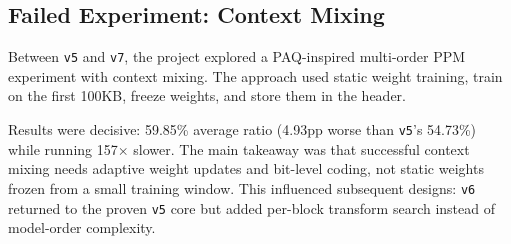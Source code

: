 \subsection{Failed Experiment: Context Mixing}
Between \texttt{v5} and \texttt{v7}, the project explored a PAQ-inspired multi-order PPM experiment with context mixing. The approach used static weight training, train on the first 100KB, freeze weights, and store them in the header.

Results were decisive: 59.85\% average ratio (4.93pp worse than \texttt{v5}'s 54.73\%) while running 157$\times$ slower. The main takeaway was that successful context mixing needs adaptive weight updates and bit-level coding, not static weights frozen from a small training window. This influenced subsequent designs: \texttt{v6} returned to the proven \texttt{v5} core but added per-block transform search instead of model-order complexity.
